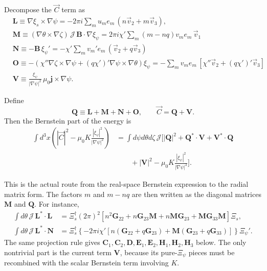 \documentclass[10pt,a4paper]{article}
\numberwithin{equation}{section}
\begin{document}
Decompose the $\vec C$ term as
\begin{equation}
\begin{aligned}
&\mathbf L \equiv \nabla \xi_s \times \nabla \psi=-2\pi i\sum_m u_m e_m\,(n\vec v_2+m\vec v_3),\\
&\mathbf M \equiv (\nabla \theta \times \nabla \zeta)\, \mathcal J \, \mathbf B \cdot \nabla \xi_\psi=2\pi i\chi'\sum_m (m-nq)v_m e_m\,\vec v_1\\
&\mathbf N \equiv -\mathbf B\, \xi_\psi'=-\chi'\sum_m v_m' e_m\,(\vec v_2+q\vec v_3)\\
&\mathbf O \equiv -\left(
\chi'' \nabla \zeta \times \nabla \psi
+
(q\chi')'
\nabla \psi \times \nabla \theta
\right)\xi_\psi=-\sum_m v_m e_m\,
\left[\chi''\vec v_2+(q\chi')'\vec v_3\right]\\
&\mathbf V \equiv
\frac{\xi_\psi}{|\nabla \psi|^2}
\, \mu_0 \mathbf j \times \nabla \psi.
\end{aligned}
\label{eq:fieldpieces}
\end{equation}

\noindent Define
\begin{equation}
\mathbf Q \equiv \mathbf L+\mathbf M+\mathbf N+\mathbf O,
\qquad
\vec C=\mathbf Q+\mathbf V .
\label{eq:CeqQplusV}
\end{equation}
Then the Bernstein part of the energy is
\begin{equation}
\begin{aligned}
\int d^3x\left(|\vec C|^2-\mu_0K\frac{|\xi_\psi|^2}{|\nabla\psi|^2}\right)
&=
\int d\psi d\theta d\zeta\,\mathcal J
\Big[
|\mathbf Q|^2
+\mathbf Q^*\cdot\mathbf V+\mathbf V^*\cdot\mathbf Q \\
&\qquad
+|\mathbf V|^2
-\mu_0K\frac{|\xi_\psi|^2}{|\nabla\psi|^2}
\Big].
\end{aligned}
\end{equation}

This is the actual route from the real-space Bernstein expression to the radial matrix form.  The factors \(m\) and \(m-nq\) are then written as the diagonal matrices \(\mathbf M\) and \(\mathbf Q\).
For instance,
\begin{equation}
\begin{aligned}
\int d\theta\,\mathcal J\,\mathbf L^*\cdot\mathbf L
&=
\Xi_s^\dagger
(2\pi)^2
\left[
n^2\mathbf G_{22}
{}+n\mathbf G_{23}\mathbf M
{}+n\mathbf M\mathbf G_{23}
{}+\mathbf M\mathbf G_{33}\mathbf M
\right]\Xi_s,\\
\int d\theta\,\mathcal J\,\mathbf L^*\cdot\mathbf N
&=
\Xi_s^\dagger
\left\{
-2\pi i\chi'
\left[
n(\mathbf G_{22}+q\mathbf G_{23})
{}+\mathbf M(\mathbf G_{23}+q\mathbf G_{33})
\right]
\right\}
\Xi_\psi'.
\end{aligned}
\end{equation}
The same projection rule gives \(\mathbf C_1,\mathbf C_2,\mathbf D,\mathbf E_1,\mathbf E_2,\mathbf H_1,\mathbf H_2,\mathbf H_3\) below.  The only nontrivial part is the current term \(\mathbf V\), because its pure-\(\Xi_\psi\) pieces must be recombined with the scalar Bernstein term involving \(K\).
\end{document}
